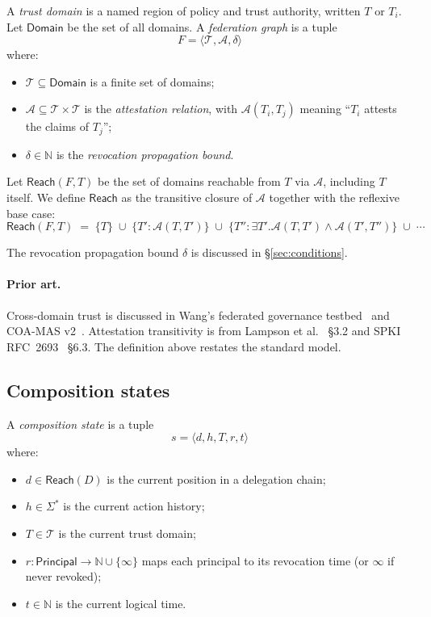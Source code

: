 \documentclass[11pt,a4paper]{article}
\theoremstyle{plain}
\theoremstyle{definition}
\theoremstyle{remark}
\begin{document}
A \emph{trust domain} is a named region of policy and trust authority, written
$T$ or $T_i$. Let $\mathsf{Domain}$ be the set of all domains. A
\emph{federation graph} is a tuple
\begin{equation*}
F = \langle \mathcal{T}, \mathcal{A}, \delta \rangle
\end{equation*}
where:
\begin{itemize}
  \item $\mathcal{T} \subseteq \mathsf{Domain}$ is a finite set of domains;
  \item $\mathcal{A} \subseteq \mathcal{T} \times \mathcal{T}$ is the
  \emph{attestation relation}, with $\mathcal{A}(T_i, T_j)$ meaning ``$T_i$
  attests the claims of $T_j$'';
  \item $\delta \in \mathbb{N}$ is the \emph{revocation propagation bound}.
\end{itemize}

Let $\mathsf{Reach}(F, T)$ be the set of domains reachable from $T$ via
$\mathcal{A}$, including $T$ itself. We define $\mathsf{Reach}$ as the
transitive closure of $\mathcal{A}$ together with the reflexive base case:
\begin{equation*}
\mathsf{Reach}(F, T) \;=\; \{T\} \;\cup\; \{T' : \mathcal{A}(T, T')\}
\;\cup\; \{T'' : \exists T'. \mathcal{A}(T, T') \wedge \mathcal{A}(T', T'')\}
\;\cup\; \cdots
\end{equation*}

The revocation propagation bound $\delta$ is discussed in
\S\ref{sec:conditions}.

\paragraph{Prior art.} Cross-domain trust is discussed in Wang's federated
governance testbed~\cite{wang2026federated} and COA-MAS
v2~\cite{coamas2026}. Attestation transitivity is from Lampson et
al.~\cite{lampson1992authentication} \S3.2 and SPKI RFC~2693~\cite{rfc2693spki}
\S6.3. The definition above restates the standard model.

\subsection{Composition states}

A \emph{composition state} is a tuple
\begin{equation*}
s = \langle d, h, T, r, t \rangle
\end{equation*}
where:
\begin{itemize}
  \item $d \in \mathsf{Reach}(D)$ is the current position in a delegation chain;
  \item $h \in \Sigma^*$ is the current action history;
  \item $T \in \mathcal{T}$ is the current trust domain;
  \item $r : \mathsf{Principal} \to \mathbb{N} \cup \{\infty\}$ maps each
  principal to its revocation time (or $\infty$ if never revoked);
  \item $t \in \mathbb{N}$ is the current logical time.
\end{itemize}
\end{document}
